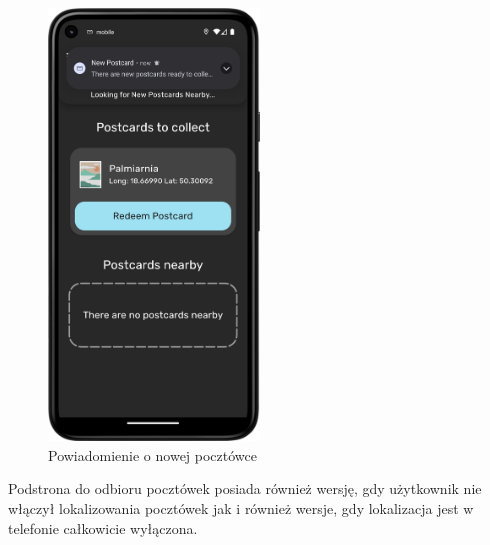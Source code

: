 \documentclass[a4paper,twoside,12pt]{book}
\begin{document}
\begin{figure}[H]
    \centering
    \includegraphics[width=0.5\textwidth]{mobile_ss/powiadomienie.png}
    \caption{Powiadomienie o nowej pocztówce}
\end{figure}

Podstrona do odbioru pocztówek posiada również wersję, gdy użytkownik nie włączył lokalizowania pocztówek jak i również wersje, gdy lokalizacja jest w telefonie całkowicie wyłączona.
\end{document}

